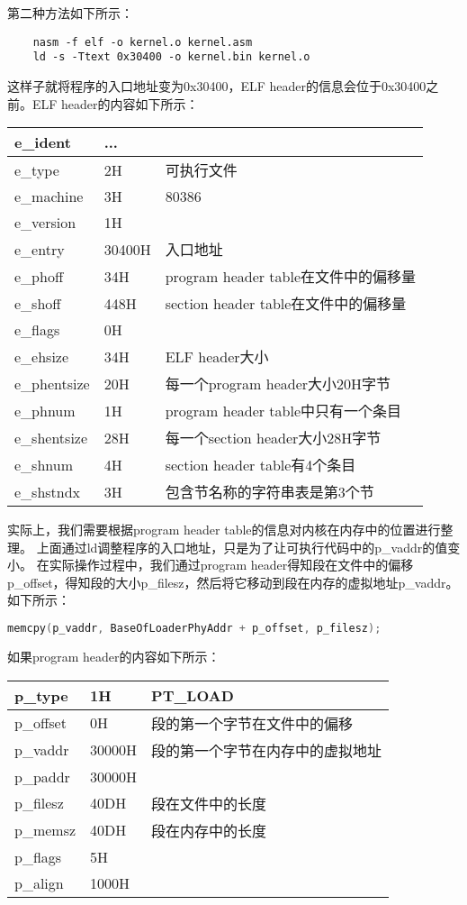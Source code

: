 \documentclass[a4paper,left=2.5cm,right=2.5cm,11pt]{article}
\newcommand{\interval}{\vspace{0.5em}}
\begin{document}
	第二种方法如下所示：
	\begin{lstlisting}
	nasm -f elf -o kernel.o kernel.asm
	ld -s -Ttext 0x30400 -o kernel.bin kernel.o
	\end{lstlisting}

	这样子就将程序的入口地址变为0x30400，ELF header的信息会位于0x30400之前。ELF header的内容如下所示：
	\interval
	\begin{longtable}{p{2cm}|p{2cm}|p{8cm}}
	\hline
	e\_ident & ... & \\
	\hline
	e\_type & 2H & 可执行文件 \\
	\hline
	e\_machine & 3H & 80386 \\
	\hline
	e\_version & 1H & \\
	\hline
	e\_entry & 30400H & 入口地址 \\
	\hline
	e\_phoff & 34H & program header table在文件中的偏移量 \\
	\hline
	e\_shoff & 448H & section header table在文件中的偏移量 \\
	\hline
	e\_flags & 0H & \\
	\hline
	e\_ehsize & 34H & ELF header大小 \\
	\hline
	e\_phentsize & 20H & 每一个program header大小20H字节 \\
	\hline
	e\_phnum & 1H & program header table中只有一个条目 \\
	\hline
	e\_shentsize & 28H & 每一个section header大小28H字节 \\
	\hline
	e\_shnum & 4H & section header table有4个条目 \\
	\hline
	e\_shstndx & 3H & 包含节名称的字符串表是第3个节 \\
	\hline
	\end{longtable}
	\interval

	实际上，我们需要根据program header table的信息对内核在内存中的位置进行整理。
	上面通过ld调整程序的入口地址，只是为了让可执行代码中的p\_vaddr的值变小。
	在实际操作过程中，我们通过program header得知段在文件中的偏移p\_offset，得知段的大小p\_filesz，然后将它移动到段在内存的虚拟地址p\_vaddr。
	如下所示：
	\begin{lstlisting}[language = C]
	memcpy(p_vaddr, BaseOfLoaderPhyAddr + p_offset, p_filesz);
	\end{lstlisting}

	如果program header的内容如下所示：
	\interval
	\begin{longtable}{p{2cm}|p{2cm}|p{8cm}}
	\hline
	p\_type & 1H & PT\_LOAD \\
	\hline
	p\_offset & 0H & 段的第一个字节在文件中的偏移 \\
	\hline
	p\_vaddr & 30000H & 段的第一个字节在内存中的虚拟地址 \\
	\hline
	p\_paddr & 30000H & \\
	\hline
	p\_filesz & 40DH & 段在文件中的长度 \\
	\hline
	p\_memsz & 40DH & 段在内存中的长度 \\
	\hline
	p\_flags & 5H & \\
	\hline
	p\_align & 1000H & \\
	\hline
	\end{longtable}
	\interval
\end{document}
